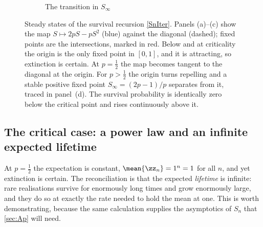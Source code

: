\begin{figure}[htbp]
    \vspace{10pt}
    \begin{subfigure}[b]{0.55\textwidth}
    \centering
    \caption{The transition in $S_\infty$}
    \end{subfigure}

    \caption{Steady states of the survival recursion \cref{SnIter}. Panels (a)--(c)
    show the map $S\mapsto 2pS-pS^{2}$ (blue) against the diagonal (dashed); fixed
    points are the intersections, marked in red. Below and at criticality the origin
    is the only fixed point in $[0,1]$, and it is attracting, so extinction is
    certain. At $p=\tfrac12$ the map becomes tangent to the diagonal at the origin.
    For $p>\tfrac12$ the origin turns repelling and a stable positive fixed point
    $S_\infty=(2p-1)/p$ separates from it, traced in panel~(d). The survival
    probability is identically zero below the critical point and rises continuously
    above it.}
    \label{fig:phase_transition}
\end{figure}

\subsection{The critical case: a power law and an infinite expected lifetime}
\label{sec:criticalcase}

At $p=\tfrac12$ the expectation is constant, $\mean{\zz_n} = 1^n = 1$ for all $n$,
and yet extinction is certain. The reconciliation is that the expected
\emph{lifetime} is infinite: rare realisations survive for enormously long times and
grow enormously large, and they do so at exactly the rate needed to hold the mean at
one. This is worth demonstrating, because the same calculation supplies the
asymptotics of $S_n$ that \cref{sec:Ap} will need.

